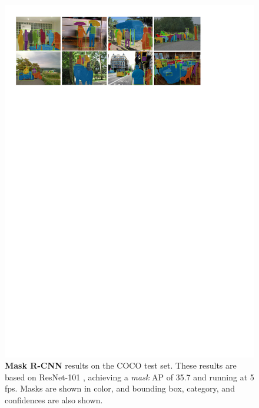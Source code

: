 \documentclass[10pt,twocolumn,letterpaper]{article}
\begin{document}
\begin{figure}[t]
\centering
\includegraphics[width=1\linewidth]{ai/results_main}
\caption{\textbf{Mask R-CNN} results on the COCO test set. These results are based on ResNet-101 \cite{He2016}, achieving a \emph{mask} AP of 35.7 and running at 5 fps. Masks are shown in color, and bounding box, category, and confidences are also shown.}
\label{fig:results_main}\vspace{-2mm}
\end{figure}
\end{document}
